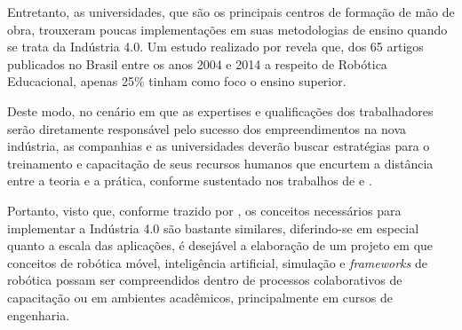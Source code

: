 Entretanto, as universidades, que são os principais centros de formação de mão de obra, trouxeram poucas implementações em suas metodologias de ensino quando se trata da Indústria 4.0. Um estudo realizado por  revela que, dos 65 artigos publicados no Brasil entre os anos 2004 e 2014 a respeito de Robótica Educacional, apenas 25\% tinham como foco o ensino superior.
    
Deste modo, no cenário em que as expertises e qualificações dos trabalhadores serão diretamente responsável pelo sucesso dos empreendimentos na nova indústria, as companhias e as universidades deverão buscar estratégias para o treinamento e capacitação de seus recursos humanos que encurtem a distância entre a teoria e a prática, conforme sustentado nos trabalhos de \cite{Benesova2017} e \cite{Gonzalez2018}.

Portanto, visto que, conforme trazido por \cite{Khomchenko2018}, os conceitos necessários para implementar a Indústria 4.0 são bastante similares, diferindo-se em especial quanto a escala das aplicações, é desejável a elaboração de um projeto em que conceitos de robótica móvel, inteligência artificial, simulação e \textit{frameworks} de robótica possam ser compreendidos dentro de processos colaborativos de capacitação ou em ambientes acadêmicos, principalmente em cursos de engenharia.       

\begin{comment}
\section{Organização do trabalho}
\label{section:organizacao}

Este documento apresenta $5$ capítulos e está estruturado da seguinte forma:

\begin{itemize}

  \item \textbf{Capítulo \ref{chap:intro} - Introdução}: Contextualiza o âmbito, no qual a pesquisa proposta está inserida. Apresenta, portanto, a definição do problema, objetivos e justificativas da pesquisa e como este \thetypeworkthree está estruturado;
  \item \textbf{Capítulo \ref{chap:fundteor} - Fundamentação Teórica}: XXX;
  \item \textbf{Capítulo \ref{chap:mat} - Materiais e Métodos}: XXX;
  \item \textbf{Capítulo \ref{chap:result} - Resultados}: XXX;
  \item \textbf{Capítulo \ref{chap:conc} - Conclusão}: Apresenta as conclusóes, contribuições e algumas sugestões de atividades de pesquisa a serem desenvolvidas no futuro.

\end{itemize}
\end{comment}